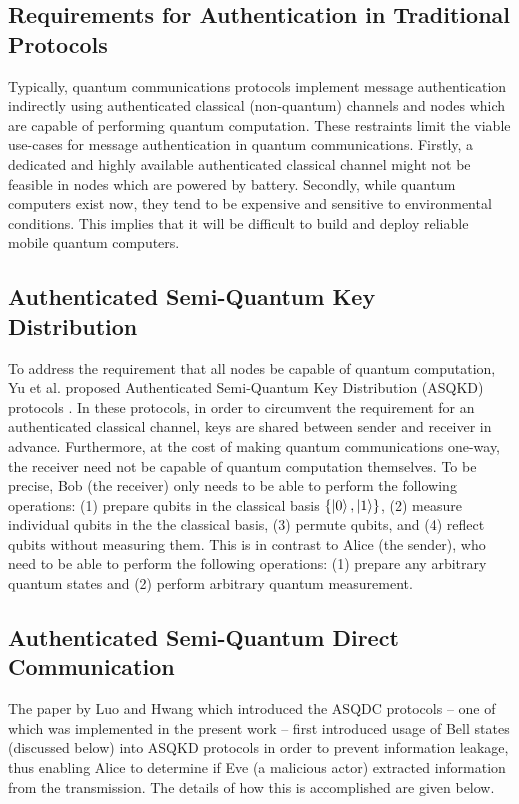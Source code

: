 \documentclass[conference]{IEEEtran}
\begin{document}
\subsection{Requirements for Authentication in Traditional Protocols}

Typically, quantum communications protocols implement message
authentication indirectly using authenticated classical (non-quantum)
channels and nodes which are capable of performing quantum computation.
These restraints limit the viable use-cases for message authentication
in quantum communications. Firstly, a dedicated and highly available
authenticated classical channel might not be feasible in nodes which are
powered by battery. Secondly, while quantum computers exist now, they tend
to be expensive and sensitive to environmental conditions. This implies
that it will be difficult to build and deploy reliable mobile quantum
computers.

\subsection{Authenticated Semi-Quantum Key Distribution}

To address the requirement that all nodes be capable of quantum computation,
Yu et al. proposed Authenticated Semi-Quantum Key Distribution (ASQKD)
protocols \cite{YuEtAl}. In these protocols, in order to circumvent the requirement
for an authenticated classical channel, keys are shared between sender
and receiver in advance. Furthermore, at the cost of making quantum
communications one-way, the receiver need not be capable of quantum
computation themselves. To be precise, Bob (the receiver) only needs
to be able to perform the following operations: (1) prepare qubits
in the classical basis $\left\{ \ket{0} ,\ket{1} \right\} $,
(2) measure individual qubits in the the classical basis, (3) permute
qubits, and (4) reflect qubits without measuring them. This is in
contrast to Alice (the sender), who need to be able to perform the
following operations: (1) prepare any arbitrary quantum states and
(2) perform arbitrary quantum measurement.

\subsection{Authenticated Semi-Quantum Direct Communication}

The paper by Luo and Hwang which introduced the ASQDC protocols --
one of which was implemented in the present work --
first introduced usage of Bell states (discussed
below) into ASQKD protocols in order to prevent information leakage,
thus enabling Alice to determine if Eve (a malicious actor) extracted
information from the transmission. The details of how this is accomplished
are given below.
\end{document}
